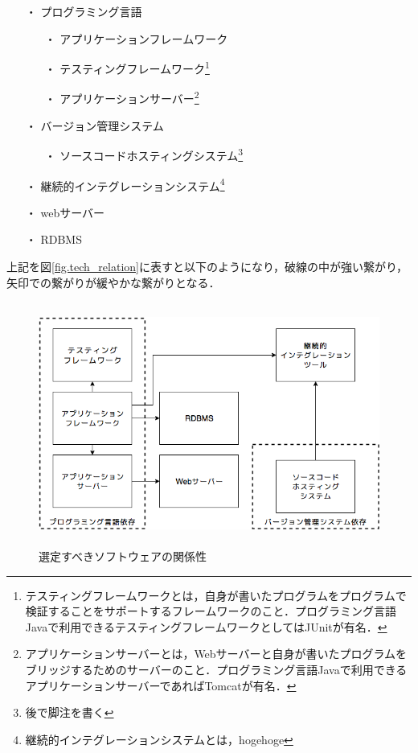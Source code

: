 \begin{itemize}
 \item[・]プログラミング言語
   \begin{itemize}
    \item[・]アプリケーションフレームワーク
    \item[・]テスティングフレームワーク\footnote{テスティングフレームワークとは，自身が書いたプログラムをプログラムで検証することをサポートするフレームワークのこと．プログラミング言語Javaで利用できるテスティングフレームワークとしてはJUnitが有名．}
    \item[・]アプリケーションサーバー\footnote{アプリケーションサーバーとは，Webサーバーと自身が書いたプログラムをブリッジするためのサーバーのこと．プログラミング言語Javaで利用できるアプリケーションサーバーであればTomcatが有名．}
   \end{itemize}
 \item[・]バージョン管理システム
   \begin{itemize}
     \item[・]ソースコードホスティングシステム\footnote{後で脚注を書く}
   \end{itemize}
 \item[・]継続的インテグレーションシステム\footnote{継続的インテグレーションシステムとは，hogehoge}
 \item[・]webサーバー
 \item[・]RDBMS
\end{itemize}

上記を図\ref{fig.tech_relation}に表すと以下のようになり，破線の中が強い繋がり，矢印での繋がりが緩やかな繋がりとなる．

\begin{figure}[H]
  \begin{center}
    \includegraphics[height=8cm]{./assets/images/tech_relation.png}
    \caption{選定すべきソフトウェアの関係性}
    \label{fig:tech_relation}
  \end{center}
\end{figure}

